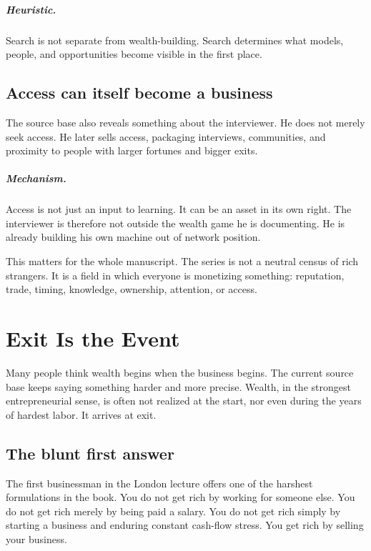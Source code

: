 \documentclass[11pt,oneside]{book}
\begin{document}
\paragraph{Heuristic.} Search is not separate from wealth-building. Search determines what models, people, and opportunities become visible in the first place.

\section{Access can itself become a business}

The source base also reveals something about the interviewer. He does not merely seek access. He later sells access, packaging interviews, communities, and proximity to people with larger fortunes and bigger exits.

\paragraph{Mechanism.} Access is not just an input to learning. It can be an asset in its own right. The interviewer is therefore not outside the wealth game he is documenting. He is already building his own machine out of network position.

This matters for the whole manuscript. The series is not a neutral census of rich strangers. It is a field in which everyone is monetizing something: reputation, trade, timing, knowledge, ownership, attention, or access.

\chapter{Exit Is the Event}

Many people think wealth begins when the business begins. The current source base keeps saying something harder and more precise. Wealth, in the strongest entrepreneurial sense, is often not realized at the start, nor even during the years of hardest labor. It arrives at exit.

\section{The blunt first answer}

The first businessman in the London lecture offers one of the harshest formulations in the book. You do not get rich by working for someone else. You do not get rich merely by being paid a salary. You do not get rich simply by starting a business and enduring constant cash-flow stress. You get rich by selling your business.
\end{document}
